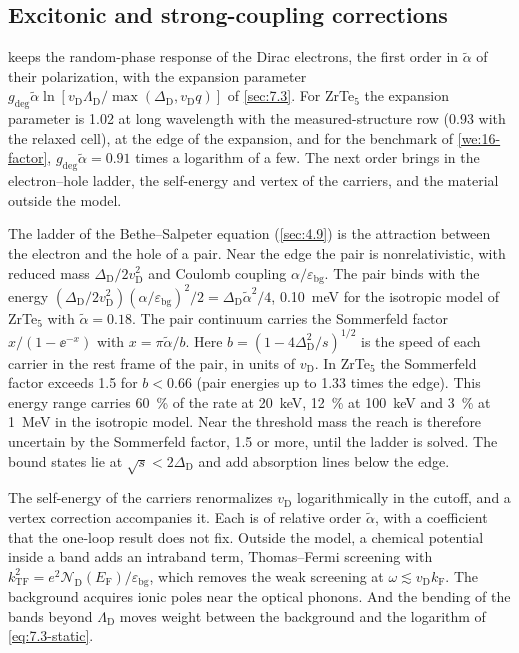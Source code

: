 \subsection{Excitonic and strong-coupling corrections}\label{sec:16.1-validity}

 keeps the random-phase response of the Dirac electrons, the first order in $\tilde\alpha$ of their polarization, with the expansion parameter $g_{\mathrm{deg}}\tilde\alpha\ln[v_{\mathrm{D}}\Lambda_{\mathrm{D}}/\max(\Delta_{\mathrm{D}}, v_{\mathrm{D}}q)]$ of \cref{sec:7.3}. For ZrTe$_5$ the expansion parameter is 1.02 at long wavelength with the measured-structure row (0.93 with the relaxed cell), at the edge of the expansion, and for the benchmark of \cref{we:16-factor}, $g_{\mathrm{deg}}\tilde\alpha = 0.91$ times a logarithm of a few. The next order brings in the electron--hole ladder, the self-energy and vertex of the carriers, and the material outside the model.

The ladder of the Bethe--Salpeter equation (\cref{sec:4.9}) is the attraction between the electron and the hole of a pair. Near the edge the pair is nonrelativistic, with reduced mass $\Delta_{\mathrm{D}}/2v_{\mathrm{D}}^2$ and Coulomb coupling $\alpha/\varepsilon_{\mathrm{bg}}$. The pair binds with the energy $(\Delta_{\mathrm{D}}/2v_{\mathrm{D}}^2)(\alpha/\varepsilon_{\mathrm{bg}})^2/2 = \Delta_{\mathrm{D}}\tilde\alpha^2/4$, \SI{0.10}{meV} for the isotropic model of ZrTe$_5$ with $\tilde\alpha = 0.18$. The pair continuum carries the Sommerfeld factor $x/(1 - \ee^{-x})$ with $x = \pi\tilde\alpha/b$. Here $b = (1 - 4\Delta_{\mathrm{D}}^2/s)^{1/2}$ is the speed of each carrier in the rest frame of the pair, in units of $v_{\mathrm{D}}$. In ZrTe$_5$ the Sommerfeld factor exceeds 1.5 for $b < 0.66$ (pair energies up to 1.33 times the edge). This energy range carries \SI{60}{\percent} of the rate at \SI{20}{keV}, \SI{12}{\percent} at \SI{100}{keV} and \SI{3}{\percent} at \SI{1}{MeV} in the isotropic model. Near the threshold mass the reach is therefore uncertain by the Sommerfeld factor, 1.5 or more, until the ladder is solved. The bound states lie at $\sqrt{s} < 2\Delta_{\mathrm{D}}$ and add absorption lines below the edge.

The self-energy of the carriers renormalizes $v_{\mathrm{D}}$ logarithmically in the cutoff, and a vertex correction accompanies it. Each is of relative order $\tilde\alpha$, with a coefficient that the one-loop result does not fix. Outside the model, a chemical potential inside a band adds an intraband term, Thomas--Fermi screening with $k_{\mathrm{TF}}^2 = e^2\mathcal{N}_{\mathrm{D}}(E_{\mathrm{F}})/\varepsilon_{\mathrm{bg}}$, which removes the weak screening at $\omega \lesssim v_{\mathrm{D}}k_{\mathrm{F}}$. The background acquires ionic poles near the optical phonons. And the bending of the bands beyond $\Lambda_{\mathrm{D}}$ moves weight between the background and the logarithm of \cref{eq:7.3-static}.

